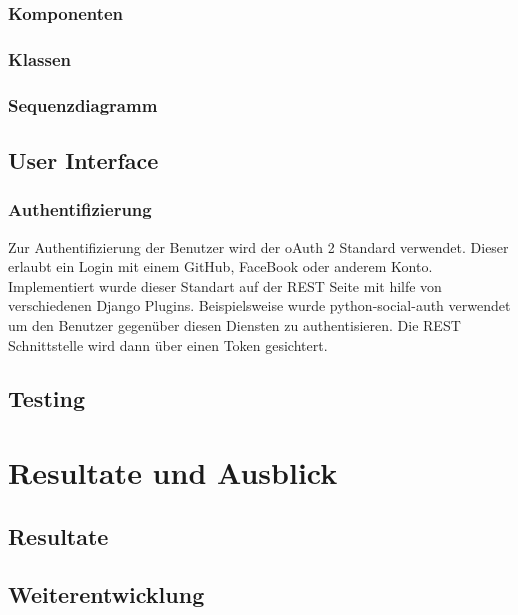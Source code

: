 \subsection{Komponenten}


\subsection{Klassen}


\subsection{Sequenzdiagramm}



\section{User Interface}
\subsection{Authentifizierung}
Zur Authentifizierung der Benutzer wird der oAuth 2 Standard verwendet. Dieser erlaubt ein Login mit einem GitHub, FaceBook oder anderem Konto. Implementiert wurde dieser Standart auf der REST Seite mit hilfe von verschiedenen Django Plugins. 
Beispielsweise wurde python-social-auth verwendet um den Benutzer gegenüber diesen Diensten zu authentisieren. Die REST Schnittstelle wird dann über einen Token gesichtert.


\section{Testing}


\chapter{Resultate und Ausblick}

\section{Resultate}


\section{Weiterentwicklung}


